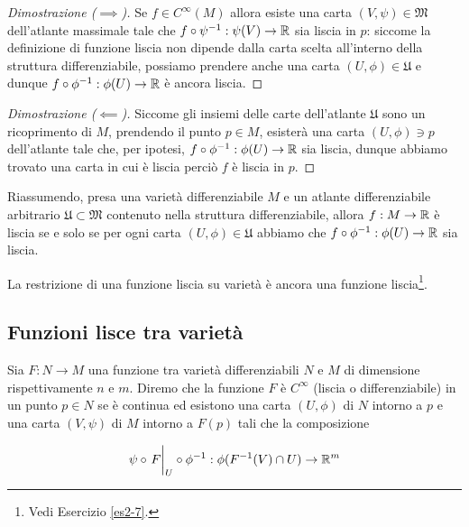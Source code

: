 \begin{proof}[Dimostrazione ($ \implies $)]
	Se $ f \in C^{\infty}(M) $ allora esiste una carta $ (V,\psi) \in \mathfrak{M} $ dell'atlante massimale tale che $ f \circ \psi^{-1} : \psi(V) \to \mathbb{R} $ sia liscia in $ p $: siccome la definizione di funzione liscia non dipende dalla carta scelta all'interno della struttura differenziabile, possiamo prendere anche una carta $ (U,\phi) \in \mathfrak{U} $ e dunque $ f \circ \phi^{-1} : \phi(U) \to \mathbb{R} $ è ancora liscia.
\end{proof}

\begin{proof}[Dimostrazione ($ \impliedby $)]
	Siccome gli insiemi delle carte dell'atlante $ \mathfrak{U} $ sono un ricoprimento di $ M $, prendendo il punto $ p \in M $, esisterà una carta $ (U,\phi) \ni p $ dell'atlante tale che, per ipotesi, $ f \circ \phi^{-1} : \phi(U) \to \mathbb{R} $ sia liscia, dunque abbiamo trovato una carta in cui è liscia perciò $ f $ è liscia in $ p $.
\end{proof}

Riassumendo, presa una varietà differenziabile $ M $ e un atlante differenziabile arbitrario $ \mathfrak{U} \subset \mathfrak{M} $ contenuto nella struttura differenziabile, allora $ f : M \to \mathbb{R} $ è liscia se e solo se per ogni carta $ (U,\phi) \in \mathfrak{U} $ abbiamo che $ f \circ \phi^{-1} : \phi(U) \to \mathbb{R} $ sia liscia.

\begin{remark}
	La restrizione di una funzione liscia su varietà è ancora una funzione liscia\footnote{%
		Vedi Esercizio \ref{es2-7}.%
	}.
\end{remark}

\subsection{Funzioni lisce tra varietà}

Sia $ F : N \to M $ una funzione tra varietà differenziabili $ N $ e $ M $ di dimensione rispettivamente $ n $ e $ m $. Diremo che la funzione $ F $ è $ C^{\infty} $ (liscia o differenziabile) in un punto $ p \in N $ se è continua ed esistono una carta $ (U,\phi) $ di $ N $ intorno a $ p $ e una carta $ (V,\psi) $ di $ M $ intorno a $ F(p) $ tali che la composizione

\begin{equation}
	\psi \circ \eval{F}_{U} \circ \phi^{-1} : \phi(F^{-1}(V) \cap U) \to \R^{m}
\end{equation}

